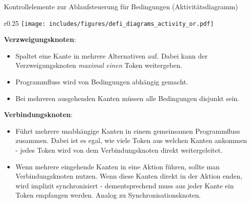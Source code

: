 \begin{diag}{Kontrollelemente zur Ablaufsteuerung für Bedingungen (Aktivitätsdiagramm)}
    \begin{wrapfigure}{r}{0.25\textwidth}
        \centering
        \texttt{[image: includes/figures/defi\_diagrams\_activity\_or.pdf]}
    \end{wrapfigure}
    \textbf{Verzweigungsknoten}:
    \begin{itemize}
        \item Spaltet eine Kante in mehrere Alternativen auf.
              Dabei kann der Verzweigungsknoten \emph{maximal einen} Token weitergeben.
        \item Programmfluss wird von Bedingungen abhängig gemacht.
        \item Bei mehreren ausgehenden Kanten müssen alle Bedingungen disjunkt sein.
    \end{itemize}

    \textbf{Verbindungsknoten}:
    \begin{itemize}
        \item Führt mehrere unabhängige Kanten in einem gemeinsamen Programmfluss zusammen.
              Dabei ist es egal, wie viele Token aus welchen Kanten ankommen - jedes Token wird von dem Verbindungsknoten direkt weitergeleitet.
        \item Wenn mehrere eingehende Kanten in eine Aktion führen, sollte man Verbindungsknoten nutzen.
              Wenn diese Kanten direkt in der Aktion enden, wird implizit synchronisiert - dementsprechend muss aus jeder Kante ein Token empfangen werden.
              Analog zu Synchronisationsknoten.
    \end{itemize}
\end{diag}


